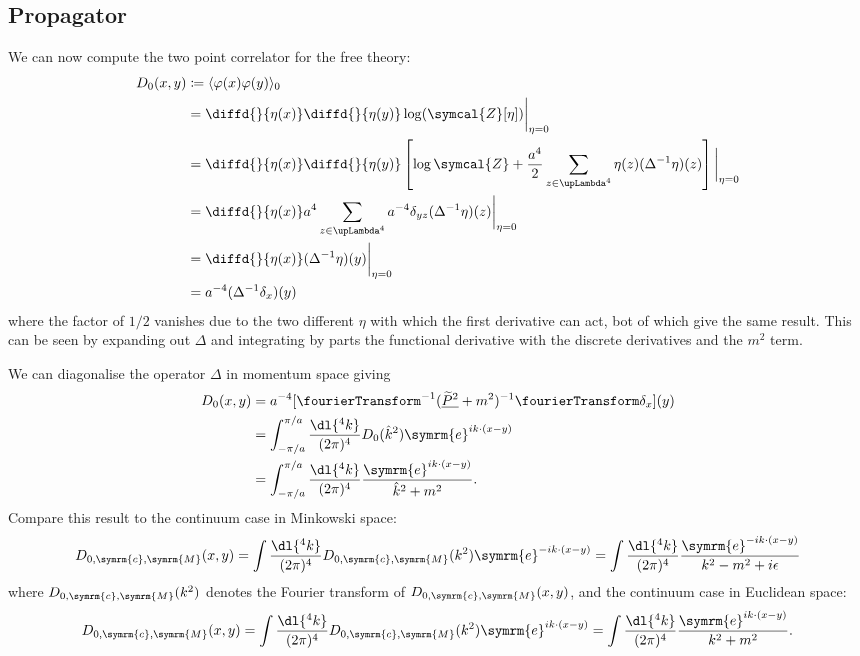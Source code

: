 \documentclass[fleqn]{NotesClass}
\newcommand{\e}{\symrm{e}}
\DeclarePairedDelimiter{\correlator}{\langle}{\rangle}
\newcommand{\partitionFunction}{\symcal{Z}}
\newcommand{\lattice}[1][4]{\upLambda^{#1}}
\newcommand{\multiplicative}[1]{\underline{#1}}
\begin{document}
    \subsection{Propagator}
    We can now compute the two point correlator for the free theory:
    \begin{align}
        D_0(x, y) &\coloneqq \correlator{\varphi(x)\varphi(y)}_{0}\\
        &= \diffd{}{\eta(x)}\diffd{}{\eta(y)} \log(\partitionFunction[\eta])\bigg|_{\eta = 0}\\
        &= \diffd{}{\eta(x)}\diffd{}{\eta(y)}\left[ \log\partitionFunction + \frac{a^4}{2}\sum_{z\in\lattice} \eta(z)(\Delta^{-1}\eta)(z) \right] \bigg|_{\eta = 0}\\
        &= \diffd{}{\eta(x)} a^4 \sum_{z\in\lattice} a^{-4}\delta_{yz}(\Delta^{-1}\eta)(z) \bigg|_{\eta = 0}\\
        &= \diffd{}{\eta(x)} (\Delta^{-1}\eta)(y) \bigg|_{\eta = 0}\\
        &= a^{-4}(\Delta^{-1}\delta_x)(y)
    \end{align}
    where the factor of \(1/2\) vanishes due to the two different \(\eta\) with which the first derivative can act, bot of which give the same result.
    This can be seen by expanding out \(\Delta\) and integrating by parts the functional derivative with the discrete derivatives and the \(m^2\) term.
    
    We can diagonalise the operator \(\Delta\) in momentum space giving
    \begin{align}
        D_0(x, y) &= a^{-4}[\fourierTransform^{-1}(\multiplicative{\widetilde{P}^2} + m^2)^{-1}\fourierTransform\delta_x](y)\\
        &= \int_{-\pi/a}^{\pi/a} \frac{\dl{^4k}}{(2\pi)^4} D_0(\hat{k}^2) \e^{ik\cdot (x - y)}\\
        &= \int_{-\pi/a}^{\pi/a} \frac{\dl{^4k}}{(2\pi)^4} \frac{\e^{ik\cdot(x - y)}}{\hat{k}^2 + m^2}.
    \end{align}
    Compare this result to the continuum case in Minkowski space:
    \begin{equation}
        D_{0,\symrm{c},\symrm{M}}(x, y) = \int \frac{\dl{^4k}}{(2\pi)^4} D_{0,\symrm{c},\symrm{M}}(k^2) \e^{-ik \cdot (x - y)} = \int \frac{\dl{^4k}}{(2\pi)^4} \frac{\e^{-ik \cdot (x - y)}}{k^2 - m^2 + i\epsilon}
    \end{equation}
    where \(D_{0, \symrm{c}, \symrm{M}}(k^2)\) denotes the Fourier transform of \(D_{0, \symrm{c}, \symrm{M}}(x, y)\), and the continuum case in Euclidean space:
    \begin{equation}
        D_{0,\symrm{c},\symrm{M}}(x, y) = \int \frac{\dl{^4k}}{(2\pi)^4} D_{0,\symrm{c},\symrm{M}}(k^2) \e^{ik \cdot (x - y)} = \int \frac{\dl{^4k}}{(2\pi)^4} \frac{\e^{ik \cdot (x - y)}}{k^2 + m^2}.
    \end{equation}
    
\end{document}
